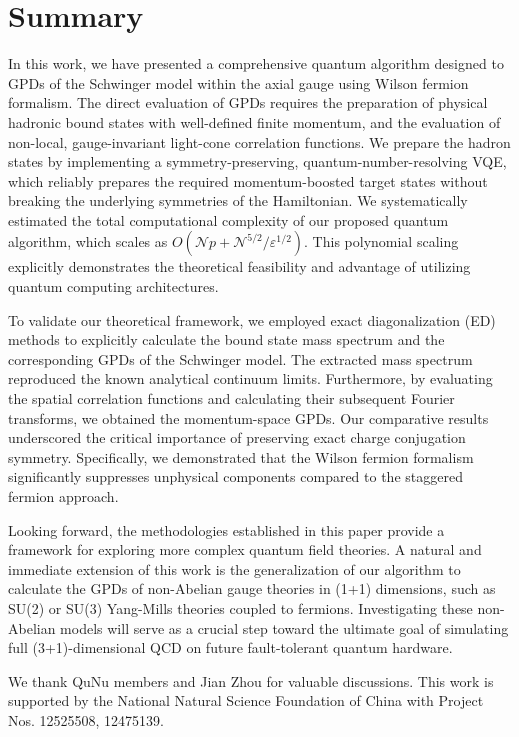 \documentclass[aps,prd,twocolumn,superscriptaddress,notitlepage,nofootinbib,preprintnumbers]{revtex4-1}
\begin{document}
\section{Summary}
\label{sec-sum}
In this work, we have presented a comprehensive quantum algorithm designed to GPDs of the Schwinger model within the axial gauge using Wilson fermion formalism. The direct evaluation of GPDs requires the preparation of physical hadronic bound states with well-defined finite momentum, and the evaluation of non-local, gauge-invariant light-cone correlation functions. We prepare the hadron states by implementing a symmetry-preserving, quantum-number-resolving VQE, which reliably prepares the required momentum-boosted target states without breaking the underlying symmetries of the Hamiltonian. We systematically estimated the total computational complexity of our proposed quantum algorithm, which scales as $O(\mathcal{N}p+\mathcal{N}^{5/2}/\varepsilon^{1/2})$. This polynomial scaling explicitly demonstrates the theoretical feasibility and advantage of utilizing quantum computing architectures.

To validate our theoretical framework, we employed exact diagonalization (ED) methods to explicitly calculate the bound state mass spectrum and the corresponding GPDs of the Schwinger model. The extracted mass spectrum reproduced the known analytical continuum limits. Furthermore, by evaluating the spatial correlation functions and calculating their subsequent Fourier transforms, we obtained the momentum-space GPDs. Our comparative results underscored the critical importance of preserving exact charge conjugation symmetry. Specifically, we demonstrated that the Wilson fermion formalism significantly suppresses unphysical components compared to the staggered fermion approach.

Looking forward, the methodologies established in this paper provide a framework for exploring more complex quantum field theories. A natural and immediate extension of this work is the generalization of our algorithm to calculate the GPDs of non-Abelian gauge theories in (1+1) dimensions, such as SU(2) or SU(3) Yang-Mills theories coupled to fermions. Investigating these non-Abelian models will serve as a crucial step toward the ultimate goal of simulating full (3+1)-dimensional QCD on future fault-tolerant quantum hardware. 

\begin{acknowledgments}
We thank QuNu members and Jian Zhou for valuable discussions. This work is supported by the National Natural Science Foundation of China with Project Nos. 12525508, 12475139.
\end{acknowledgments}
\end{document}
